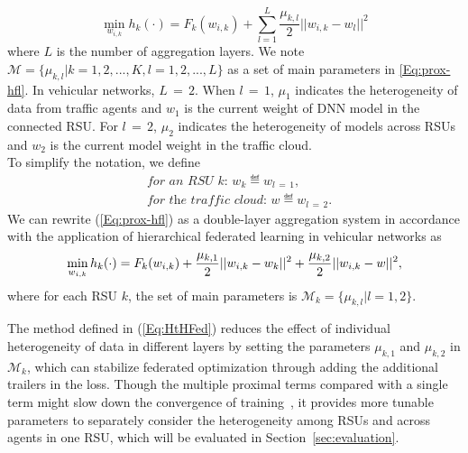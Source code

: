 \begin{equation}
    \label{Eq:prox-hfl}
    \min_{w_{i,k}} h_k(\mathord{\cdot}) = F_k(w_{i,k}) + \sum_{l=1}^{L} \frac{\mu_{k,l}}{2} ||w_{i,k}-w_l||^2
\end{equation}
where $L$ is the number of aggregation layers. We note $\mathcal{M} = \{\mu_{k,l}|k=1,2,...,K, l=1,2,...,L\}$ as a set of main parameters in \ref{Eq:prox-hfl}. In vehicular networks, $L\,=\,2$. When $l\,=\,1$, $\mu_1$ indicates the heterogeneity of data from traffic agents and $w_1$ is the current weight of DNN model in the connected RSU. For $l\,=\,2$, $\mu_2$ indicates the heterogeneity of models across RSUs and $w_2$ is the current model weight in the traffic cloud.\\
To simplify the notation, we define 
\begin{equation}
    \label{Eq:wdef}
    \begin{split}
        &\textit{for an RSU $k$: }  w_k \eqdef w_{l\,=\,1}, \\
        &\textit{for the traffic cloud: }  w \eqdef w_{l\,=\,2}.
    \end{split}
\end{equation}
We can rewrite (\ref{Eq:prox-hfl}) as a double-layer aggregation system in accordance with the application of hierarchical federated learning in vehicular networks as
\begin{equation}
    \label{Eq:HtHFed}
    \min_{w_{i,k}} h_k(\mathord{\cdot}) = F_k(w_{i,k}) + {\frac{\mu_{k,1}}{2} ||w_{i,k}-w_k||^2} \\ 
    + {\frac{\mu_{k,2}}{2} ||w_{i,k}-w||^2},
\end{equation}
where for each RSU $k$, the set of main parameters is $\mathcal{M}_k = \{\mu_{k,l}|l=1,2\}$.


The method defined in (\ref{Eq:HtHFed}) reduces the effect of individual heterogeneity of data in different layers by setting the parameters $\mu_{k,1}$ and $\mu_{k,2}$ in $\mathcal{M}_k$, which can stabilize federated optimization through adding the additional trailers in the loss. Though the multiple proximal terms compared with a single term might slow down the convergence of training~\cite{li2020federated}, it provides more tunable parameters to separately consider the heterogeneity among RSUs and across agents in one RSU, which will be evaluated in Section~\ref{sec:evaluation}.


